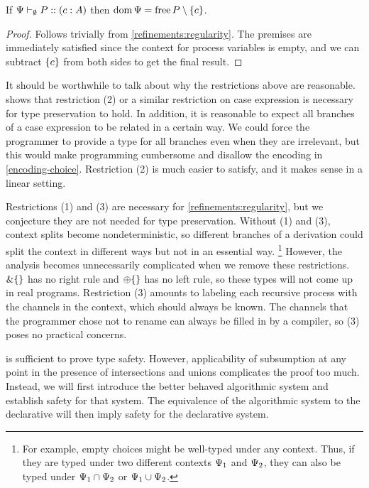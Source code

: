 \begin{corollary}
  \label{refinements:regularity-corollary}
  If ${\Psi} \vdash_{\emptyset} P :: (c : A)$ then $\operatorname{dom}\Psi = \operatorname{free} P \setminus {\lbrace c\rbrace}$.
\end{corollary}
\begin{proof}
  Follows trivially from \cref{refinements:regularity}. The premises are immediately satisfied since the context for process variables is empty, and we can subtract $\lbrace c\rbrace$ from both sides to get the final result.
\end{proof}

It should be worthwhile to talk about why the restrictions above are reasonable.  shows that restriction (2) or a similar restriction on case expression is necessary for type preservation to hold. In addition, it is reasonable to expect all branches of a case expression to be related in a certain way. We could force the programmer to provide a type for all branches even when they are irrelevant, but this would make programming cumbersome and disallow the encoding in \cref{encoding-choice}. Restriction (2) is much easier to satisfy, and it makes sense in a linear setting.

Restrictions (1) and (3) are necessary for \cref{refinements:regularity}, but we conjecture they are not needed for type preservation. Without (1) and (3), context splits become nondeterministic, so different branches of a derivation could split the context in different ways but not in an essential way.%
\footnote{For example, empty choices might be well-typed under any context. Thus, if they are typed under two different contexts $\Psi_1$ and $\Psi_2$, they can also be typed under $\Psi_1 \cap \Psi_2$ or $\Psi_1 \cup \Psi_2$.}
However, the analysis becomes unnecessarily complicated when we remove these restrictions. $\&\lbrace\rbrace$ has no right rule and $\oplus\lbrace\rbrace$ has no left rule, so these types will not come up in real programs. Restriction (3) amounts to labeling each recursive process with the channels in the context, which should always be known. The channels that the programmer chose not to rename can always be filled in by a compiler, so (3) poses no practical concerns.


 is sufficient to prove type safety. However, applicability of subsumption at any point in the presence of intersections and unions complicates the proof too much. Instead, we will first introduce the better behaved algorithmic system and establish safety for that system. The equivalence of the algorithmic system to the declarative will then imply safety for the declarative system.

